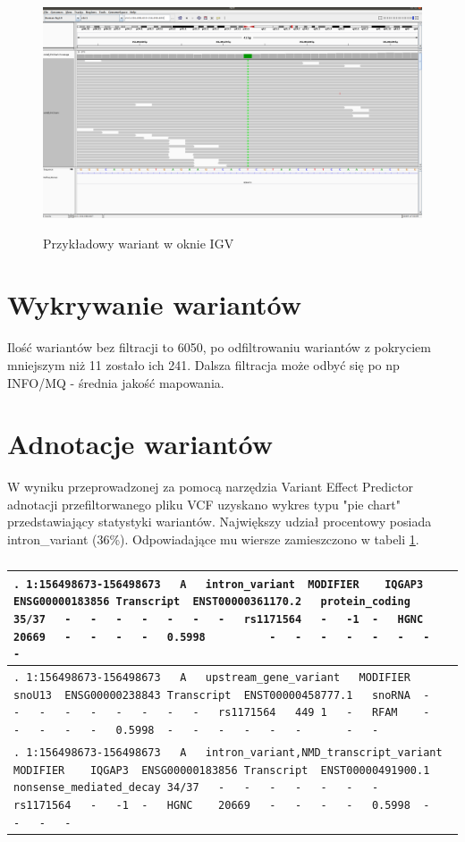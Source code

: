 \documentclass[a4paper]{article}
\begin{document}
\begin{figure}[h]
    \centering
    \includegraphics[width=1.0\textwidth]{vcf.png}
    \label{fig:igv}
    \caption[]{Przykładowy wariant w oknie IGV}
\end{figure}


\section{Wykrywanie wariantów}

Ilość wariantów bez filtracji to 6050, po odfiltrowaniu wariantów z pokryciem mniejszym niż 11 zostało ich 241. Dalsza filtracja może odbyć się po np INFO/MQ - średnia jakość mapowania.

\section{Adnotacje wariantów}
W wyniku przeprowadzonej za pomocą narzędzia Variant Effect Predictor adnotacji przefiltorwanego pliku VCF uzyskano wykres typu "pie chart" przedstawiający statystyki wariantów. Największy udział procentowy posiada intron\_variant (36\%). Odpowiadające mu wiersze zamieszczono w tabeli \ref{table:3lines}.

\begin{table}[H]
    \caption{
    \label{table:3lines}
    }
\begin{center}
\begin{tabular}{| p{150mm} |}

    \hline
    \verb|.	1:156498673-156498673	A	intron_variant	MODIFIER	IQGAP3	ENSG00000183856	Transcript	ENST00000361170.2	protein_coding	35/37	-	-	-	-	-	-	-	rs1171564	-	-1	-	HGNC	20669	-	-	-	-	0.5998	 		-	-	-	-	-	-	-	-|
    \\
    \hline
\verb|.	1:156498673-156498673	A	upstream_gene_variant	MODIFIER	snoU13	ENSG00000238843	Transcript	ENST00000458777.1	snoRNA	-	-	-	-	-	-	-	-	-	rs1171564	449	1	-	RFAM	-	-	-	-	-	0.5998	-	-	-	-	-	-		-	-|
    \\
    \hline
\verb|.	1:156498673-156498673	A	intron_variant,NMD_transcript_variant	MODIFIER	IQGAP3	ENSG00000183856	Transcript	ENST00000491900.1	nonsense_mediated_decay	34/37	-	-	-	-	-	-	-	rs1171564	-	-1	-	HGNC	20669	-	-	-	-	0.5998	-	-	-	-|
    \\
    \hline
\end{tabular}
\end{center}
\end{table}
\end{document}
